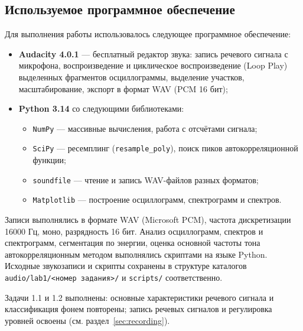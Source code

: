 \subsection{Используемое программное обеспечение}

Для выполнения работы использовалось следующее программное обеспечение:
\begin{itemize}
	\item \textbf{Audacity 4.0.1} --- бесплатный редактор звука:
		запись речевого сигнала с микрофона, воспроизведение и
		циклическое воспроизведение (Loop Play) выделенных фрагментов
		осциллограммы, выделение участков, масштабирование,
		экспорт в формат WAV (PCM 16 бит);
	\item \textbf{Python 3.14} со следующими библиотеками:
		\begin{itemize}
			\item \texttt{NumPy} --- массивные вычисления, работа с
				отсчётами сигнала;
			\item \texttt{SciPy} --- ресемплинг (\texttt{resample\_poly}),
				поиск пиков автокорреляционной функции;
			\item \texttt{soundfile} --- чтение и запись WAV-файлов
				разных форматов;
			\item \texttt{Matplotlib} --- построение осциллограмм,
				спектрограмм и спектров.
		\end{itemize}
\end{itemize}

Записи выполнялись в формате WAV (Microsoft PCM), частота дискретизации
16000 Гц, моно, разрядность 16 бит. Анализ осциллограмм, спектров и
спектрограмм, сегментация по энергии, оценка основной частоты тона
автокорреляционным методом выполнялись скриптами на языке Python.
Исходные звукозаписи и скрипты сохранены в структуре каталогов
\texttt{audio/lab1/<номер задания>/} и \texttt{scripts/} соответственно.

Задачи 1.1 и 1.2 выполнены: основные характеристики речевого сигнала и
классификация фонем повторены; запись речевых сигналов и регулировка
уровней освоены (см. раздел~\ref{sec:recording}).
